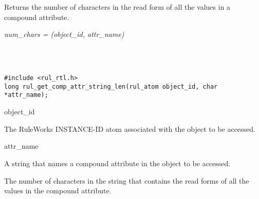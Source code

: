 \begin{seealso}



\end{seealso}

\section*{}

Returns the number of characters in the read form of all the values in
a compound attribute.

\Syntax

\it{num\_chars} =
(\it{object\_id},
\it{attr\_name})

\begin{args}
   \\
   \\
\end{args}

\CBinding
\begin{verbatim}
#include <rul_rtl.h>
long rul_get_comp_attr_string_len(rul_atom object_id, char *attr_name);
\end{verbatim}

\begin{arguments}
\item[object\_id]

  The RuleWorks INSTANCE-ID atom associated with the object to be
  accessed.

\item[attr\_name]

  A string that names a compound attribute in the object to be
  accessed.
\end{arguments}

\ReturnValue

The number of characters in the string that contains the read forms of
all the values in the compound attribute.

\begin{seealso}

\end{seealso}

